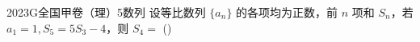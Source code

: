 
\begin{problem}{2023}{G}{全国甲卷（理）}{5}{数列}
设等比数列 $\{a_n\}$ 的各项均为正数，前 $n$ 项和 $S_n$，若 $a_1=1, S_5=5S_3-4$，则 $S_4=$
(\hspace{1cm})
\begin{choices}
\end{choices}
\end{problem}